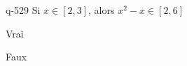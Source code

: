 \begin{truefalse}{q-529}
Si $x\in[2,3]$, alors $x^2-x\in[2,6]$
\item* Vrai
\item Faux
\end{truefalse}

